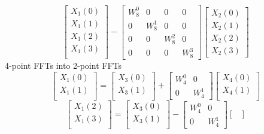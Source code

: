 \documentclass[journal,12pt,twocolumn]{IEEEtran}
\renewcommand\thesection{\arabic{section}}
\begin{document}
\begin{enumerate}[label=\arabic*.,ref=\thesection.\theenumi]
\begin{equation}
\begin{bmatrix}
X_{1}(0) \\ 
X_{1}(1)\\ 
X_{1}(2)\\
X_{1}(3)\\
\end{bmatrix}
-
\begin{bmatrix}
W^{0}_{8} & 0 & 0 & 0\\
0 & W^{1}_{8} & 0 & 0\\
0 & 0 & W^{2}_{8} & 0\\
0 & 0 & 0 & W^{3}_{8}
\end{bmatrix}
\begin{bmatrix}
X_{2}(0) \\ 
X_{2}(1) \\ 
X_{2}(2) \\
X_{2}(3)
\end{bmatrix}
\end{equation}
4-point FFTs into 2-point FFTs
\begin{equation}
\begin{bmatrix}
X_{1}(0) \\ 
X_{1}(1)\\ 
\end{bmatrix}
=
\begin{bmatrix}
X_{3}(0) \\ 
X_{3}(1)\\ 
\end{bmatrix}
+
\begin{bmatrix}
W^{0}_{4} & 0\\
0 & W^{1}_{4}
\end{bmatrix}
\begin{bmatrix}
X_{4}(0) \\ 
X_{4}(1) \\ 
\end{bmatrix}
\end{equation}
\begin{equation}
\begin{bmatrix}
X_{1}(2) \\ 
X_{1}(3)\\ 
\end{bmatrix}
=
\begin{bmatrix}
X_{3}(0) \\ 
X_{3}(1)\\ 
\end{bmatrix}
-
\begin{bmatrix}
W^{0}_{4} & 0\\
0 & W^{1}_{4}
\end{bmatrix}
\begin{bmatrix}

\end{bmatrix}
\end{equation}
\end{enumerate}
\end{document}
